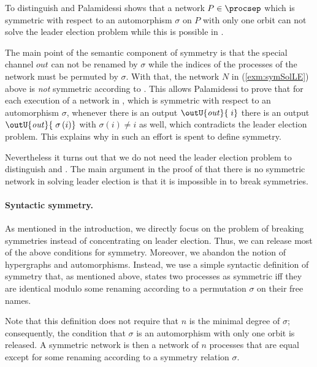 \documentclass[11pt,techReport]{eptcs}
\begin{document}
To distinguish \pimix and \pisep Palamidessi shows that a network $ P \in \procsep $ which is symmetric with respect to an automorphism $ \sigma $ on $ P $ with only one orbit can not solve the leader election problem while this is possible in \pimix.

The main point of the semantic component of symmetry is that the special channel $ \mathit{out} $ can not be renamed by $ \sigma $ while the indices of the processes of the network must be permuted by $ \sigma $.  With that, the network $ N $ in (\ref{exm:symSolLE}) above is \emph{not} symmetric according to \cite{palamidessi03}.  This allows Palamidessi to prove that for each execution of a network in \procsep, which is symmetric with respect to an automorphism $ \sigma $, whenever there is an output $ \outU{\mathit{out}}{\; i} $ there is an output $ \outU{\mathit{out}}{\; \sigma\left( i \right)} $ with $ \sigma\left( i \right) \neq i $ as well, which contradicts the leader election problem. This explains why in \cite{bouge88, palamidessi03, vigliottiPhillipsPalamidessi07} such an effort is spent to define symmetry.

Nevertheless it turns out that we do not need the leader election problem to distinguish \pimix and \pisep. The main argument in the proof of \cite{palamidessi03} that there is no symmetric network in \procsep solving leader election is that it is impossible in \pisep to break symmetries.

\paragraph{Syntactic symmetry.}

As mentioned in the introduction, we directly focus on the problem of breaking symmetries instead of concentrating on leader election. Thus, we can release most of the above conditions for symmetry. Moreover, we abandon the notion of hypergraphs and automorphisms. Instead, we use a simple syntactic definition of symmetry that, as mentioned above, states two processes as symmetric iff they are identical modulo some renaming according to a permutation $ \sigma $ on their free names.

\noindent
Note that this definition does not require that $ n $ is the minimal degree of $ \sigma $; consequently, the condition that $ \sigma $ is an automorphism with only one orbit is released. A symmetric network is then a network of $ n $ processes that are equal except for some renaming according to a symmetry relation $ \sigma $.
\end{document}
